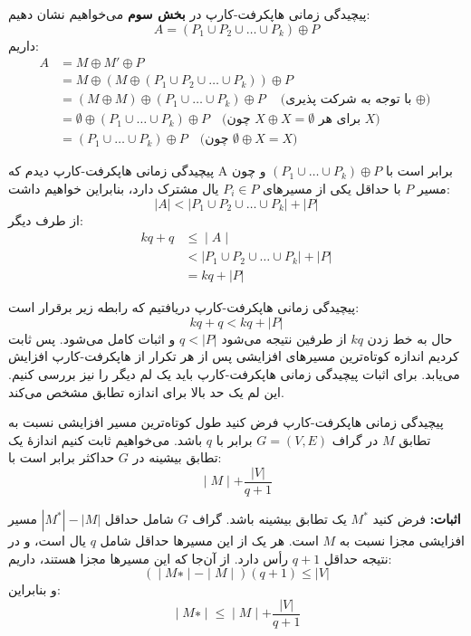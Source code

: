 \begin{itemframe}{‌پیچیدگی زمانی هاپکرفت-کارپ}
\itm
در \textbf{بخش سوم} می‌خواهیم نشان دهیم:
$$
A = (P_1 \cup P_2 \cup \dots \cup P_k) \oplus P
$$
\itm
داریم:
\begin{align*}
A &= M \oplus M' \oplus P \\
& = M \oplus (M \oplus (P_1 \cup P_2 \cup \dots \cup P_k)) \oplus P \\
&= (M \oplus M) \oplus (P_1 \cup \dots \cup P_k) \oplus P \quad
\text{(با توجه به شرکت پذیری $\oplus$)} \\
&= \emptyset \oplus (P_1 \cup \dots \cup P_k) \oplus P \quad
\text{(چون $X \oplus X = \emptyset$ برای هر $X$)} \\
&= (P_1 \cup \dots \cup P_k) \oplus P \quad
\text{(چون $\emptyset \oplus X = X$)}
\end{align*}

\end{itemframe}


\begin{itemframe}{‌پیچیدگی زمانی هاپکرفت-کارپ}
\itm
دیدم که A برابر است با
$
(P_1 \cup \dots \cup P_k) \oplus P
$
و چون مسیر $P$ با حداقل یکی از مسیرهای $P_i \in P$ یال مشترک دارد، بنابراین خواهیم داشت:
$$
|A| < |P_1 \cup P_2 \cup \dots \cup P_k| + |P|
$$
از طرف دیگر:
\begin{align*}
kq+q & ≤∣A∣\\
& < |P_1 \cup P_2 \cup \dots \cup P_k| + |P|\\
& = kq + |P|
\end{align*}

\end{itemframe}


\begin{itemframe}{‌پیچیدگی زمانی هاپکرفت-کارپ}
\itm
دریافتیم که رابطه زیر برقرار است:
$$
kq+q  < kq + |P|
$$
\itm
حال به خط زدن $kq$ از طرفین نتیجه می‌شود
$q < |P|$
و اثبات کامل می‌شود. پس ثابت کردیم اندازه کوتاه‌ترین مسیرهای افزایشی پس از هر تکرار از هاپکرفت-کارپ افزایش می‌یابد.
\itm
برای اثبات پیچیدگی زمانی هاپکرفت-کارپ باید یک لم دیگر را نیز بررسی کنیم. این لم یک حد بالا برای اندازه تطابق مشخص می‌کند.
\end{itemframe}


\begin{itemframe}{‌پیچیدگی زمانی هاپکرفت-کارپ}
\decLineSpace[0mm]
\itm
فرض کنید طول کوتاه‌ترین مسیر افزایشی نسبت به تطابق $M$ در گراف $G = (V, E)$ برابر با $q$ باشد. می‌خواهیم ثابت کنیم اندازهٔ یک تطابق بیشینه در $G$ حداکثر برابر است با:
$$∣M∣+ \frac{ |V|}{q + 1}$$

\itm
\textbf{اثبات:}
فرض کنید $M^*$ یک تطابق بیشینه باشد. گراف $G$ شامل حداقل $|M^*| - |M|$ مسیر افزایشی مجزا نسبت به $M$ است.
هر یک از این مسیرها حداقل شامل $q$ یال است، و در نتیجه حداقل
$q + 1$
رأس دارد.
\itm
از آن‌جا که این مسیرها مجزا هستند، داریم:
$$(∣M∗∣−∣M∣)(q+1) \leq |V|$$
و بنابراین:
$$∣M∗∣ \leq∣M∣ + \frac{|V|}{q + 1}$$
\end{itemframe}


